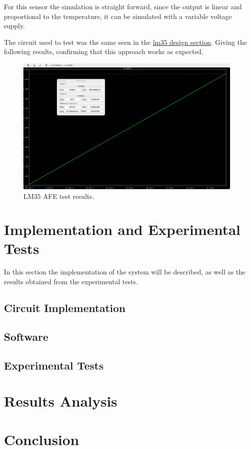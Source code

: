 \documentclass[12pt]{article}
\begin{document}
    For this sensor the simulation is straight forward, since the output is linear and proportional to the temperature, 
    it can be simulated with a variable voltage supply. 
    
    The circuit used to test was the same seen in the \hyperref[AFELM35]{lm35 design section}.
    Giving the following results, confirming that this approach works as expected. 
    
    \begin{figure}[H] 
        \centering
        \includegraphics*[scale = 0.15]{images/LM35AFERes.jpeg}
        \caption{LM35 AFE test results.}
        \label{wrap-fig:1}
    \end{figure}

\section{Implementation and Experimental Tests}

In this section the implementation of the system will be described, as well as the results obtained from the experimental tests.

\subsection{Circuit Implementation}

\subsection{Software}

\subsection{Experimental Tests}

\section{Results Analysis}

\section{Conclusion}
\end{document}
